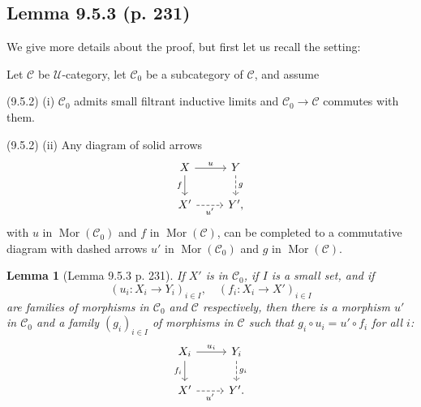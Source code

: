 \documentclass[12pt]{article}%
\newtheorem{lem}[thm]{Lemma}
\theoremstyle{remark}
\theoremstyle{definition}
\newcommand{\nn}{\noindent}
\newcommand{\C}{\mathcal C}
\newcommand{\U}{\mathcal U}
\DeclareMathOperator{\Mor}{Mor}
\begin{document}

\subsection{Lemma 9.5.3 (p. 231)}

We give more details about the proof, but first let us recall the setting:

Let $\C$ be $\U$-category, let $\C_0$ be a subcategory of $\C$, and assume 

\nn(9.5.2) (i) $\C_0$ admits small filtrant inductive limits and $\C_0\to\C$ commutes with them.

\nn(9.5.2) (ii) Any diagram of solid arrows
%
\begin{equation}\label{952ii}
\begin{tikzcd}
X\ar{d}[swap]{f}\ar{r}{u}&Y\ar[dashed]{d}{g}\\ 
X'\ar[dashed]{r}[swap]{u'}&Y',
\end{tikzcd}
\end{equation}
%
with $u$ in $\Mor(\C_0)$ and $f$ in $\Mor(\C)$, can be completed to a commutative diagram with dashed arrows $u'$ in $\Mor(\C_0)$ and $g$ in $\Mor(\C)$.

\begin{lem}[Lemma 9.5.3 p. 231]
If $X'$ is in $\C_0$, if $I$ is a small set, and if  
$$
(u_i:X_i\to Y_i)_{i\in I},\quad(f_i:X_i\to X')_{i\in I}
$$ 
are families of morphisms in $\C_0$ and $\C$ respectively, then there is a morphism $u'$ in $\C_0$ and a family $(g_i)_{i\in I}$ of morphisms in $\C$ such that $g_i\circ u_i=u'\circ f_i$ for all $i$:
$$
\begin{tikzcd}
X_i\ar{d}[swap]{f_i}\ar{r}{u_i}&Y_i\ar[dashed]{d}{g_i}\\ 
X'\ar[dashed]{r}[swap]{u'}&Y'.
\end{tikzcd}
$$ 
\end{lem}
\end{document}
